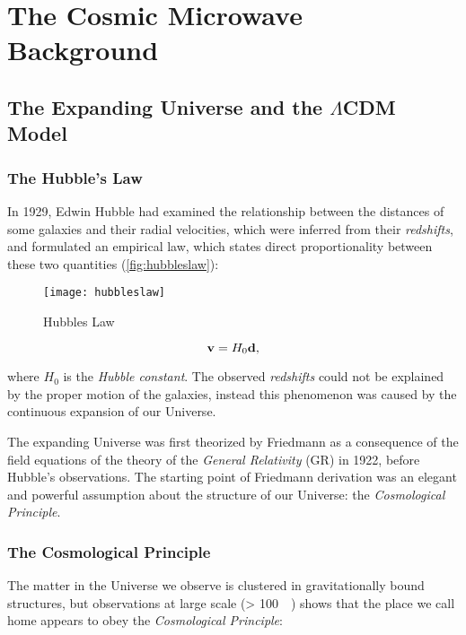 \chapter{The Cosmic Microwave Background}\label{ch:cmb}

\section{The Expanding Universe and the \texorpdfstring{$\Lambda$}{LAMBDA-}CDM Model}
\subsection{The Hubble's Law}\label{ss:hubbleslaw}

In 1929, Edwin Hubble had examined the relationship between the distances
of some galaxies and their radial velocities, which were inferred from their
\emph{redshifts}, and formulated an empirical law, which states direct
proportionality between these two quantities (\autoref{fig:hubbleslaw}):

\begin{figure}
        \centering
        \texttt{[image: hubbleslaw]}
        \caption{Hubbles Law}
        \label{fig:hubbleslaw}
\end{figure}

\begin{equation}\label{eq:hubble_law}
        \vb{v} = H_0 \vb{d},
\end{equation}

where $H_0$ is the \emph{Hubble constant}.
The observed \emph{redshifts} could not be explained by the proper motion of
the galaxies, instead this phenomenon was caused by the continuous expansion
of our Universe.

The expanding Universe was first theorized by Friedmann as a consequence of
the field equations of the theory of the \emph{General Relativity} (GR) in
1922, before Hubble's observations. The starting point of Friedmann
derivation was an elegant and powerful assumption about the structure of
our Universe: the \emph{Cosmological Principle}.

\subsection{The Cosmological Principle}\label{ss:cosmological_principle}

The matter in the Universe we observe is clustered in gravitationally bound
structures, but observations at large scale (\SI{> 100}{\mega\parsec}) shows
that the place we call home appears to obey the \emph{Cosmological
Principle}:

